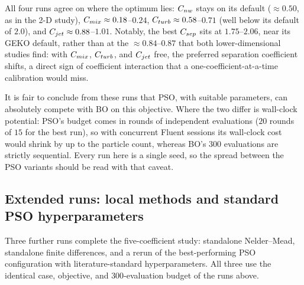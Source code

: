 All four runs agree on where the optimum lies: $C_{nw}$ stays on its default
($\approx 0.50$, as in the 2-D study), $C_{mix} \approx 0.18$--$0.24$,
$C_{turb} \approx 0.58$--$0.71$ (well below its default of $2.0$), and
$C_{jet} \approx 0.88$--$1.01$.  Notably, the best $C_{sep}$ sits at
$1.75$--$2.06$, near its GEKO default, rather than at the
$\approx 0.84$--$0.87$ that both lower-dimensional studies find: with
$C_{mix}$, $C_{turb}$, and $C_{jet}$ free, the preferred separation coefficient
shifts, a direct sign of coefficient interaction that a
one-coefficient-at-a-time calibration would miss.

It is fair to conclude from these runs that PSO, with suitable parameters,
can absolutely compete with BO on this objective.  Where the two differ is
wall-clock potential: PSO's budget comes in rounds of independent
evaluations ($20$ rounds of $15$ for the best run), so with concurrent
Fluent sessions its wall-clock cost would shrink by up to the particle
count, whereas BO's $300$ evaluations are strictly sequential.  Every run
here is a single seed, so the spread between the PSO variants should be
read with that caveat.

\subsection{Extended runs: local methods and standard PSO hyperparameters}
\label{sec:cfd-5d-extended}

Three further runs complete the five-coefficient study: standalone
Nelder--Mead, standalone finite differences, and a rerun of the
best-performing PSO configuration with literature-standard
hyperparameters.  All three use the identical case, objective, and
$300$-evaluation budget of the runs above.

